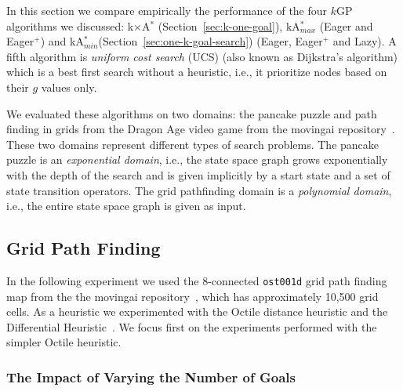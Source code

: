 \documentclass{aicom2e}
\newcommand{\kgs}{$k$GP}
\newcommand{\kastarmin}{kA$^*_{min}$}
\newcommand{\kastarmax}{kA$^*_{max}$}
\newcommand{\kxastar}{k$\times$A$^*$}
\newcommand{\roni}[1]{\textbf{[RS:#1]}}
\begin{document}
In this section we compare empirically the performance of the four \kgs{}
algorithms we discussed: \kxastar{} (Section~\ref{sec:k-one-goal}),
\kastarmax{} (Eager and Eager$^+$) and
\kastarmin{}(Section~\ref{sec:one-k-goal-search}) (Eager, Eager$^+$ and Lazy).
A fifth algorithm is {\em uniform cost search} (UCS) (also known as Dijkstra's
algorithm) which is a best first search without a heuristic, i.e., it
prioritize nodes based on their $g$ values only.


We evaluated these algorithms on two domains: the pancake puzzle and path
finding in grids from the Dragon Age video game from the movingai
repository~\cite{sturtevant2012benchmarks}. These two domains represent
different types of search problems. The pancake puzzle is an {\em exponential
domain}, i.e., the state space graph grows exponentially with the depth of the
search and is given implicitly by a start state and a set of state transition
operators. The grid pathfinding domain is a {\em polynomial domain}, i.e., the
entire state space graph is given as input. %

\subsection{Grid Path Finding}


In the following experiment we used the 8-connected {\tt ost001d} grid path
finding map from the the movingai repository~\cite{sturtevant2012benchmarks},
which has approximately 10,500 grid cells. As a heuristic we experimented with
the Octile distance heuristic and the Differential
Heuristic~\cite{goldberg2005computing,ng2002predicting,sturtevant2009memory}.
We focus first on the experiments performed with the simpler Octile heuristic.

\subsubsection{The Impact of Varying the Number of Goals}
\end{document}
